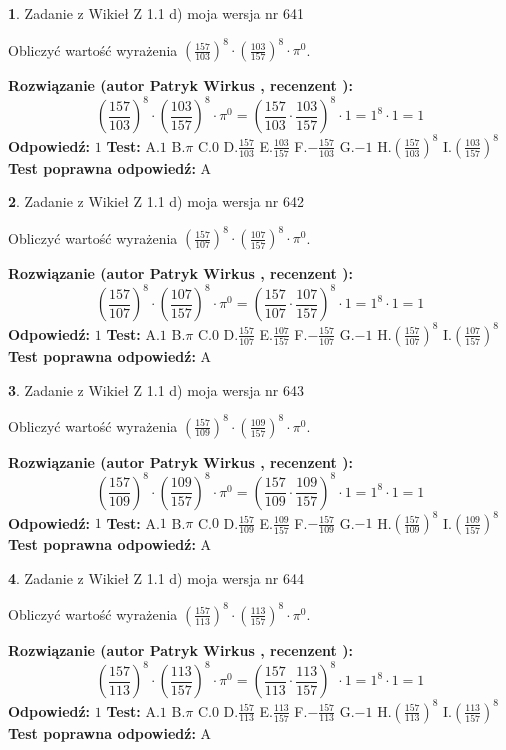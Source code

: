 \documentclass[12pt, a4paper]{article}
\theoremstyle{definition} %
\newtheorem{zad}{}
\newcommand{\zadStart}[1]{\begin{zad}#1\newline}
\newcommand{\zadStop}{\end{zad}}
\newcommand{\rozwStart}[2]{\noindent \textbf{Rozwiązanie (autor #1 , recenzent #2): }\newline}
\newcommand{\rozwStop}{\newline}
\newcommand{\odpStart}{\noindent \textbf{Odpowiedź:}\newline}
\newcommand{\odpStop}{\newline}
\newcommand{\testStart}{\noindent \textbf{Test:}\newline}
\newcommand{\testStop}{\newline}
\newcommand{\kluczStart}{\noindent \textbf{Test poprawna odpowiedź:}\newline}
\newcommand{\kluczStop}{\newline}
\begin{document}
\zadStart{Zadanie z Wikieł Z 1.1 d) moja wersja nr 641}

Obliczyć wartość wyrażenia $(\frac{157}{103})^{8} \cdot (\frac{103}{157})^{8} \cdot \pi^{0}$.
\zadStop
\rozwStart{Patryk Wirkus}{}
$$(\frac{157}{103})^{8} \cdot (\frac{103}{157})^{8} \cdot \pi^{0} = (\frac{157}{103} \cdot \frac{103}{157})^{8} \cdot 1 = 1^{8} \cdot 1 = 1$$
\rozwStop
\odpStart
$1$
\odpStop
\testStart
A.$1$ B.$\pi$ C.$0$ D.$\frac{157}{103}$ E.$\frac{103}{157}$
F.$-\frac{157}{103}$ G.$-1$
H.$(\frac{157}{103})^{8}$
I.$(\frac{103}{157})^{8}$
\testStop
\kluczStart
A
\kluczStop



\zadStart{Zadanie z Wikieł Z 1.1 d) moja wersja nr 642}

Obliczyć wartość wyrażenia $(\frac{157}{107})^{8} \cdot (\frac{107}{157})^{8} \cdot \pi^{0}$.
\zadStop
\rozwStart{Patryk Wirkus}{}
$$(\frac{157}{107})^{8} \cdot (\frac{107}{157})^{8} \cdot \pi^{0} = (\frac{157}{107} \cdot \frac{107}{157})^{8} \cdot 1 = 1^{8} \cdot 1 = 1$$
\rozwStop
\odpStart
$1$
\odpStop
\testStart
A.$1$ B.$\pi$ C.$0$ D.$\frac{157}{107}$ E.$\frac{107}{157}$
F.$-\frac{157}{107}$ G.$-1$
H.$(\frac{157}{107})^{8}$
I.$(\frac{107}{157})^{8}$
\testStop
\kluczStart
A
\kluczStop



\zadStart{Zadanie z Wikieł Z 1.1 d) moja wersja nr 643}

Obliczyć wartość wyrażenia $(\frac{157}{109})^{8} \cdot (\frac{109}{157})^{8} \cdot \pi^{0}$.
\zadStop
\rozwStart{Patryk Wirkus}{}
$$(\frac{157}{109})^{8} \cdot (\frac{109}{157})^{8} \cdot \pi^{0} = (\frac{157}{109} \cdot \frac{109}{157})^{8} \cdot 1 = 1^{8} \cdot 1 = 1$$
\rozwStop
\odpStart
$1$
\odpStop
\testStart
A.$1$ B.$\pi$ C.$0$ D.$\frac{157}{109}$ E.$\frac{109}{157}$
F.$-\frac{157}{109}$ G.$-1$
H.$(\frac{157}{109})^{8}$
I.$(\frac{109}{157})^{8}$
\testStop
\kluczStart
A
\kluczStop



\zadStart{Zadanie z Wikieł Z 1.1 d) moja wersja nr 644}

Obliczyć wartość wyrażenia $(\frac{157}{113})^{8} \cdot (\frac{113}{157})^{8} \cdot \pi^{0}$.
\zadStop
\rozwStart{Patryk Wirkus}{}
$$(\frac{157}{113})^{8} \cdot (\frac{113}{157})^{8} \cdot \pi^{0} = (\frac{157}{113} \cdot \frac{113}{157})^{8} \cdot 1 = 1^{8} \cdot 1 = 1$$
\rozwStop
\odpStart
$1$
\odpStop
\testStart
A.$1$ B.$\pi$ C.$0$ D.$\frac{157}{113}$ E.$\frac{113}{157}$
F.$-\frac{157}{113}$ G.$-1$
H.$(\frac{157}{113})^{8}$
I.$(\frac{113}{157})^{8}$
\testStop
\kluczStart
A
\kluczStop
\end{document}
